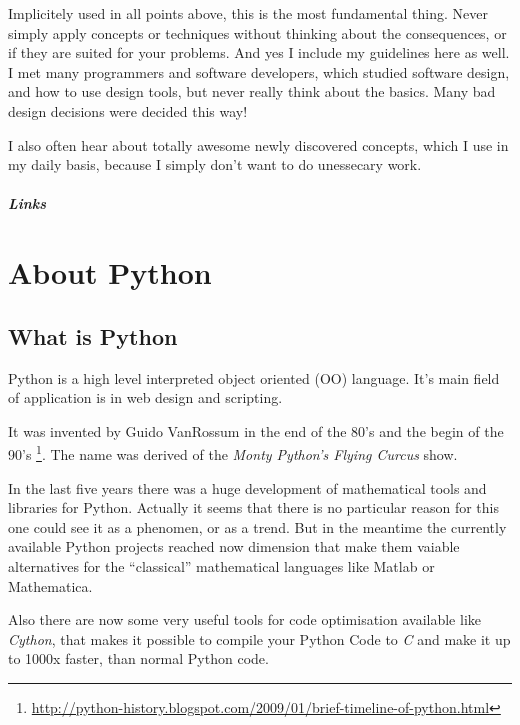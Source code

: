 \documentclass[letterpaper,10pt,english]{manual}
\begin{document}
Implicitely used in all points above, this is the most fundamental thing.
Never simply apply concepts or techniques without thinking about the consequences,
or if they are suited for your problems. And yes I include my guidelines here as well.
I met many programmers and software developers, which studied software design, and
how to use design tools, but never really think about the basics. Many bad design decisions
were decided this way!

I also often hear about totally awesome newly discovered concepts, which I use in my daily basis,
because I simply don't want to do unessecary work.
\paragraph{Links}

\resetcurrentobjects
\hypertarget{--doc-Python}{}

\chapter{About Python}


\section{What is Python}

Python is a high level interpreted object oriented (OO) language.
It's main field of application is in web design and scripting.

It was invented by Guido VanRossum in the end of the 80's and the begin of
the 90's \footnote{
\href{http://python-history.blogspot.com/2009/01/brief-timeline-of-python.html}{http://python-history.blogspot.com/2009/01/brief-timeline-of-python.html}
}. The name was derived of the \emph{Monty Python's Flying Curcus}
show.

In the last five years there was a huge development of mathematical tools
and libraries for Python. Actually it seems that there is no particular reason for
this one could see it as a phenomen, or as a trend. But in the meantime the currently
available Python projects reached now dimension that make them vaiable alternatives
for the ``classical'' mathematical languages like Matlab or Mathematica.

Also there are now some very useful tools for code optimisation available like \emph{Cython},
that makes it possible to compile your Python Code to \emph{C} and make it up to 1000x faster,
than normal Python code.
\end{document}
